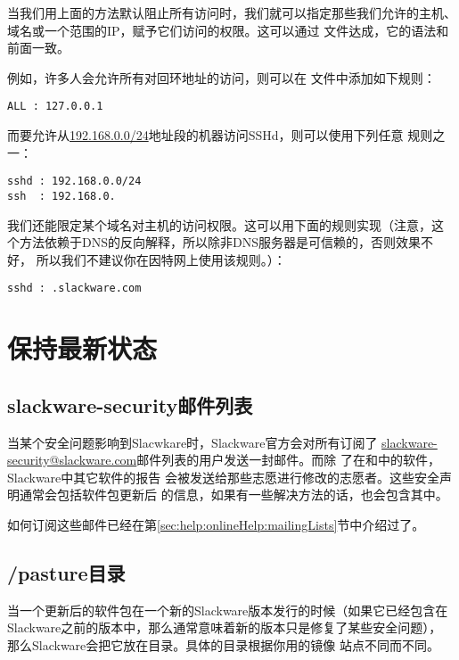 当我们用上面的方法默认阻止所有访问时，我们就可以指定那些我们允许的主机、
域名或一个范围的IP，赋予它们访问的权限。这可以通过
文件达成，它的语法和前面一致。

例如，许多人会允许所有对回环地址的访问，则可以在
文件中添加如下规则：
\begin{Verbatim}[frame=single, commandchars=\\\{\}]
ALL : 127.0.0.1
\end{Verbatim}

而要允许从\url{192.168.0.0/24}地址段的机器访问SSHd，则可以使用下列任意
规则之一：
\begin{Verbatim}[frame=single, commandchars=\\\{\}]
sshd : 192.168.0.0/24
ssh  : 192.168.0.
\end{Verbatim}

我们还能限定某个域名对主机的访问权限。这可以用下面的规则实现（注意，这
个方法依赖于DNS的反向解释，所以除非DNS服务器是可信赖的，否则效果不好，
所以我们不建议你在因特网上使用该规则。）：
\begin{Verbatim}[frame=single, commandchars=\\\{\}]
sshd : .slackware.com
\end{Verbatim}

\section{保持最新状态}
\label{chap:security:keepingCurrent}

\subsection{slackware-security邮件列表}
\label{chap:security:keepingCurrent:mailingList}
当某个安全问题影响到Slacwkare时，Slackware官方会对所有订阅了
\url{slackware-security@slackware.com}邮件列表的用户发送一封邮件。而除
了在和中的软件，Slackware中其它软件的报告
会被发送给那些志愿进行修改的志愿者。这些安全声明通常会包括软件包更新后
的信息，如果有一些解决方法的话，也会包含其中。

如何订阅这些邮件已经在第\ref{sec:help:onlineHelp:mailingLists}节中介绍过了。

\subsection{/pasture目录}
\label{chap:security:keepingCurrent:pasture}
当一个更新后的软件包在一个新的Slackware版本发行的时候（如果它已经包含在
Slackware之前的版本中，那么通常意味着新的版本只是修复了某些安全问题），
那么Slackware会把它放在目录。具体的目录根据你用的镜像
站点不同而不同。

